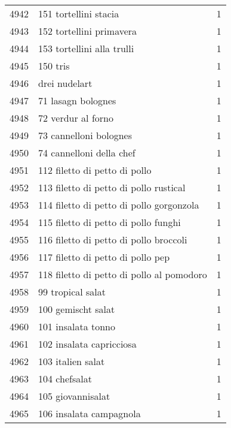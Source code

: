 \begin{tabular}{llr}
4942 &                              151 tortellini stacia &      1 \\
4943 &                           152 tortellini primavera &      1 \\
4944 &                         153 tortellini alla trulli &      1 \\
4945 &                                           150 tris &      1 \\
4946 &                                      drei nudelart &      1 \\
4947 &                                 71 lasagn bolognes &      1 \\
4948 &                                 72 verdur al forno &      1 \\
4949 &                             73 cannelloni bolognes &      1 \\
4950 &                           74 cannelloni della chef &      1 \\
4951 &                      112 filetto di petto di pollo &      1 \\
4952 &             113 filetto di petto di pollo rustical &      1 \\
4953 &           114 filetto di petto di pollo gorgonzola &      1 \\
4954 &               115 filetto di petto di pollo funghi &      1 \\
4955 &             116 filetto di petto di pollo broccoli &      1 \\
4956 &                  117 filetto di petto di pollo pep &      1 \\
4957 &          118 filetto di petto di pollo al pomodoro &      1 \\
4958 &                                  99 tropical salat &      1 \\
4959 &                                 100 gemischt salat &      1 \\
4960 &                                 101 insalata tonno &      1 \\
4961 &                           102 insalata capricciosa &      1 \\
4962 &                                  103 italien salat &      1 \\
4963 &                                      104 chefsalat &      1 \\
4964 &                                  105 giovannisalat &      1 \\
4965 &                            106 insalata campagnola &      1 \\

\end{tabular}
